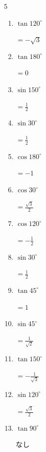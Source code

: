 \begin{multicols}{5}
\begin{enumerate}
        $\displaystyle =0$

  \item $\displaystyle \tan{120^\circ}$

        $\displaystyle =-\sqrt{3}$

  \item $\displaystyle \tan{180^\circ}$

        $\displaystyle =0$

  \item $\displaystyle \sin{150^\circ}$

        $\displaystyle =\frac{1}{2}$

  \item $\displaystyle \sin{30^\circ}$

        $\displaystyle =\frac{1}{2}$

  \item $\displaystyle \cos{180^\circ}$

        $\displaystyle =-1$

  \item $\displaystyle \cos{30^\circ}$

        $\displaystyle =\frac{\sqrt{3}}{2}$

  \item $\displaystyle \cos{120^\circ}$

        $\displaystyle =-\frac{1}{2}$

  \item $\displaystyle \sin{30^\circ}$

        $\displaystyle =\frac{1}{2}$

  \item $\displaystyle \tan{45^\circ}$

        $\displaystyle =1$

  \item $\displaystyle \sin{45^\circ}$

        $\displaystyle =\frac{1}{\sqrt{2}}$

  \item $\displaystyle \tan{150^\circ}$

        $\displaystyle =-\frac{1}{\sqrt{3}}$

  \item $\displaystyle \sin{120^\circ}$

        $\displaystyle =\frac{\sqrt{3}}{2}$

  \item $\displaystyle \tan{90^\circ}$

        $\displaystyle なし$


\end{enumerate}
\end{multicols}
